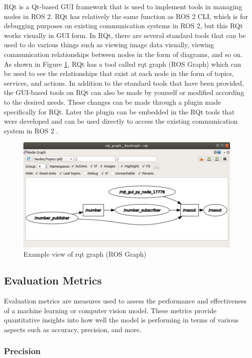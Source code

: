 RQt is a Qt-based GUI framework that is used to implement tools in managing nodes in ROS 2. RQt has relatively the same function as ROS 2 CLI, which is for debugging purposes on existing communication systems in ROS 2, but this RQt works visually in GUI form. In RQt, there are several standard tools that can be used to do various things such as viewing image data visually, viewing communication relationships between nodes in the form of diagrams, and so on.
As shown in Figure \ref{fig:rqtgraph}, RQt has a tool called rqt graph (ROS Graph) which can be used to see the relationships that exist at each node in the form of topics, services, and actions.
In addition to the standard tools that have been provided, the GUI-based tools on RQt can also be made by yourself or modified according to the desired needs. These changes can be made through a plugin made specifically for RQt. Later the plugin can be embedded in the RQt tools that were developed and can be used directly to access the existing communication system in ROS 2 \parencite{fikri2021}.
\begin{figure}[ht]
  \centering
  \includegraphics[scale=0.45]{gambar/rqt_graph.png}
  \caption{Example view of rqt graph (ROS Graph)}
  \label{fig:rqtgraph}
\end{figure}


\subsection{Evaluation Metrics}
\label{subsec:evaluation-metrics}

Evaluation metrics are measures used to assess the performance and effectiveness of a machine learning or computer vision model. These metrics provide quantitative insights into how well the model is performing in terms of various aspects such as accuracy, precision, and more.

\subsubsection{Precision}
\label{subsubsec:precision}

